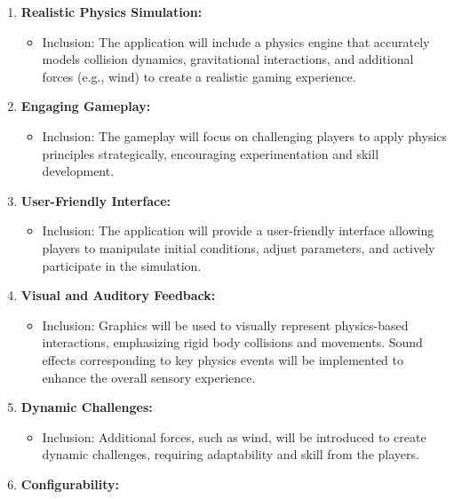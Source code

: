 \documentclass[
]{article}
\begin{document}
\begin{enumerate}
\def\labelenumi{\arabic{enumi}.}
\item
  \textbf{Realistic Physics Simulation:}

  \begin{itemize}
  \item
    Inclusion: The application will include a physics engine that
    accurately models collision dynamics, gravitational interactions,
    and additional forces (e.g., wind) to create a realistic gaming
    experience.
  \end{itemize}
\item
  \textbf{Engaging Gameplay:}

  \begin{itemize}
  \item
    Inclusion: The gameplay will focus on challenging players to apply
    physics principles strategically, encouraging experimentation and
    skill development.
  \end{itemize}
\item
  \textbf{User-Friendly Interface:}

  \begin{itemize}
  \item
    Inclusion: The application will provide a user-friendly interface
    allowing players to manipulate initial conditions, adjust
    parameters, and actively participate in the simulation.
  \end{itemize}
\item
  \textbf{Visual and Auditory Feedback:}

  \begin{itemize}
  \item
    Inclusion: Graphics will be used to visually represent physics-based
    interactions, emphasizing rigid body collisions and movements. Sound
    effects corresponding to key physics events will be implemented to
    enhance the overall sensory experience.
  \end{itemize}
\item
  \textbf{Dynamic Challenges:}

  \begin{itemize}
  \item
    Inclusion: Additional forces, such as wind, will be introduced to
    create dynamic challenges, requiring adaptability and skill from the
    players.
  \end{itemize}
\item
  \textbf{Configurability:}


\end{enumerate}
\end{document}
